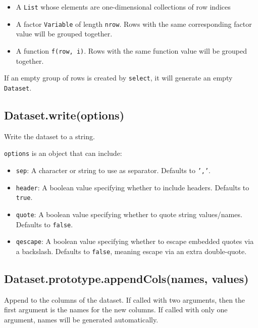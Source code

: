\documentclass{article}
\begin{document}
\begin{itemize}

\item A \texttt{List} whose elements are one-dimensional collections of row indices

\item A factor \texttt{Variable} of length \texttt{nrow}.  Rows with the same corresponding
factor value will be grouped together.

\item A function \texttt{f(row, i)}.  Rows with the same function value will be grouped
together.

\end{itemize}

If an empty group of rows is created by \texttt{select}, it will generate an empty \texttt{Dataset}.


    \subsection{Dataset.write(options)}
    Write the dataset to a string.


\texttt{options} is an object that can include:


\begin{itemize}

\item \texttt{sep}: A character or string to use as separator. Defaults to \texttt{','}.

\item \texttt{header}: A boolean value specifying whether to include headers. Defaults to \texttt{true}.

\item \texttt{quote}: A boolean value specifying whether to quote string values/names. Defaults
 to \texttt{false}.

\item \texttt{qescape}: A boolean value specifying whether to escape embedded quotes via a
 backslash. Defaults to \texttt{false}, meaning escape via an extra double-quote.

\end{itemize}

    \subsection{Dataset.prototype.appendCols(names, values)}
    Append to the columns of the dataset.
If called with two arguments, then the first argument is the names for the
new columns. If called with only one argument, names will be generated
automatically.
\end{document}
